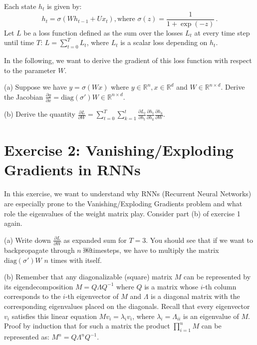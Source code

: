 \documentclass[12pt]{article}
\begin{document}
\noindent Each state $h_t$ is given by:
\begin{equation*}
h_t = \sigma(W h_{t-1} + U x_t), \text{where } \sigma(z) =\frac{1}{1+\exp(-z)} \,.
\end{equation*}
Let $L$ be a loss function defined as the sum over the losses $L_t$ at every time step until time $T$: $L=\sum_{t=0}^T L_t$, where $L_t$ is a scalar loss depending on $h_t$.

In the following, we want to derive the gradient of this loss function with respect to the parameter $W$.

(a) Suppose we have $y=\sigma(Wx)$ where $y\in \mathbb{R}^n, x\in \mathbb{R}^d$ and $W \in \mathbb{R}^{n \times d}$. Derive the Jacobian $\frac{\partial y}{\partial x} = \mathrm{diag}(\sigma') W \in \mathbb{R}^{n \times d}$.

(b) Derive the quantity $\frac{\partial L}{\partial W} = \sum_{t=0}^T \sum_{k=1}^t \frac{\partial L_t}{\partial h_t} \frac{\partial h_t}{\partial h_k} \frac{\partial h_k}{\partial W}$. 

\section{\begingroup \large Exercise 2: Vanishing/Exploding Gradients in RNNs \endgroup}

\noindent In this exercise, we want to understand why RNNs (Recurrent Neural Networks) are especially prone to the Vanishing/Exploding Gradients problem and what role the eigenvalues of the weight matrix play. Consider part (b) of exercise 1 again.

(a) Write down $\frac{\partial L}{\partial W}$ as expanded sum for $T = 3$. You should see that if we want to backpropagate through $n$ ￼timesteps, we have to multiply the matrix $\mathrm{diag}(\sigma')W$ $n$ times with itself.

(b) Remember that any diagonalizable (square) matrix $M$ can be represented by its eigendecomposition $M=Q\Lambda Q^{-1}$  where $Q$ is a matrix whose $i$-th column corresponds to the $i$-th eigenvector of $M$ and $\Lambda$ is a diagonal matrix with the corresponding eigenvalues placed on the diagonals. Recall that every eigenvector $v_i$ satisfies this linear equation $M v_i = \lambda_i v_i$, where $\lambda_i = \Lambda_{ii}$ is an eigenvalue of $M$. Proof by induction that for such a matrix the product $\prod_{i=1}^n M$ can be represented as: $M^n = Q \Lambda^n Q^{-1}$.
\end{document}
